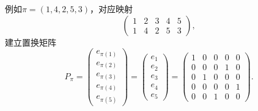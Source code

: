 \begin{subappendices}
例如$\pi= (1,4,2,5,3)$，对应映射
\begin{equation*}
  \begin{pmatrix}
    1 & 2 & 3 & 4 & 5 \\
    1 & 4 & 2 & 5 & 3
  \end{pmatrix},
\end{equation*}
建立置换矩阵
\begin{equation*}
  P_{\pi} =
  \begin{pmatrix}
    e_{\pi(1)} \\
    e_{\pi(2)} \\
    e_{\pi(3)} \\
    e_{\pi(4)} \\
    e_{\pi(5)}
  \end{pmatrix}
  = \begin{pmatrix}
  e_{1} \\ e_{2} \\ e_{3} \\ e_{4} \\ e_{5}
  \end{pmatrix}
  = \begin{pmatrix}
  1 & 0 & 0 & 0 & 0 \\
  0 & 0 & 0 & 1 & 0 \\
  0 & 1 & 0 & 0 & 0 \\
  0 & 0 & 0 & 0 & 1 \\
  0 & 0 & 1 & 0 & 0
  \end{pmatrix}.
\end{equation*}


\end{subappendices}
